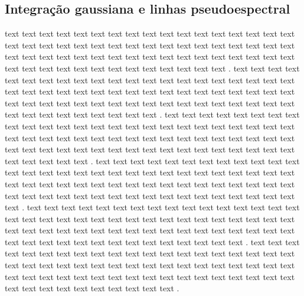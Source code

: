 \subsection{Integração gaussiana e linhas pseudoespectral}
 text text text text text text text text text text text text text text text text text text text text text text text text text text text text text text text text text text text text text text text text text text text text text text text text text text text text text text text text text text text text text text text text .
  text text text text text text text text text text text text text text text text text text text text text text text text text text text text text text text text text text text text text text text text text text text text text text text text text text text text text text text text text text text text text text text text .
  text text text text text text text text text text text text text text text text text text text text text text text text text text text text text text text text text text text text text text text text text text text text text text text text text text text text text text text text text text text text text text text text .
  text text text text text text text text text text text text text text text text text text text text text text text text text text text text text text text text text text text text text text text text text text text text text text text text text text text text text text text text text text text text text text text text .
  text text text text text text text text text text text text text text text text text text text text text text text text text text text text text text text text text text text text text text text text text text text text text text text text text text text text text text text text text text text text text text text text .
  text text text text text text text text text text text text text text text text text text text text text text text text text text text text text text text text text text text text text text text text text text text text text text text text text text text text text text text text text text text text text text text text .
 
